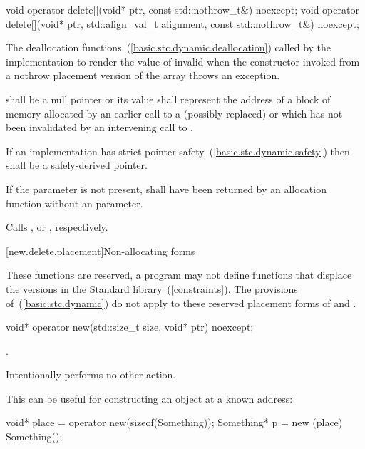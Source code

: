 %
\begin{itemdecl}
void operator delete[](void* ptr, const std::nothrow_t&) noexcept;
void operator delete[](void* ptr, std::align_val_t alignment, const std::nothrow_t&) noexcept;
\end{itemdecl}

\begin{itemdescr}
\pnum
\effects
The
deallocation functions~(\ref{basic.stc.dynamic.deallocation})
called by the implementation
to render the value of  invalid
when the constructor invoked from a nothrow
placement version of the array  throws an exception.

\pnum
\replaceable
{}

\pnum
\requires
{} shall be a null pointer or
its value shall represent the address of
a block of memory allocated by
an earlier call to a (possibly replaced)
or
which has not been invalidated by an intervening call to
.

\pnum
\requires
If an implementation has strict pointer safety~(\ref{basic.stc.dynamic.safety})
then  shall be a safely-derived pointer.

\pnum
\requires
If the  parameter is not present,
 shall have been returned by an allocation function
without an  parameter.

\pnum
{}
Calls ,
or ,
respectively.
\end{itemdescr}

[new.delete.placement]{Non-allocating forms}

\pnum
These functions are reserved, a \Cpp program may not define functions that displace
the versions in the Standard \Cpp library~(\ref{constraints}).
The provisions of~(\ref{basic.stc.dynamic}) do not apply to these reserved
placement forms of  and .

%
\begin{itemdecl}
void* operator new(std::size_t size, void* ptr) noexcept;
\end{itemdecl}

\begin{itemdescr}
\pnum
\returns
{}.

\pnum
\remarks
Intentionally performs no other action.

\pnum
\begin{example}
This can be useful for constructing an object at a known address:

\begin{codeblock}
void* place = operator new(sizeof(Something));
Something* p = new (place) Something();
\end{codeblock}
\end{example}
\end{itemdescr}

